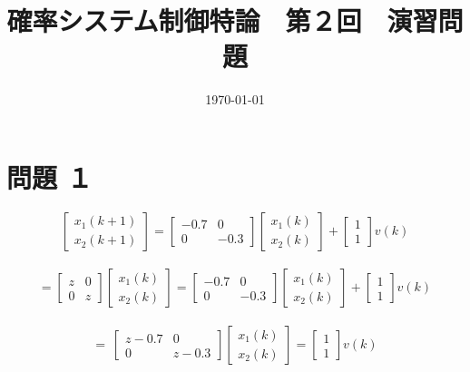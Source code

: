 \documentclass{article}
\author{}
\title{確率システム制御特論　第２回　演習問題}
\date{\today}
\begin{document}
  \maketitle

\section{問題 １}

$$  \begin{bmatrix}
    x_1(k+1)\\x_2(k+1)
  \end{bmatrix}
=
  \begin{bmatrix}
    -0.7 & 0 \\ 0 & -0.3
  \end{bmatrix}
  \begin{bmatrix}
    x_1(k)\\x_2(k)
  \end{bmatrix}
+
  \begin{bmatrix}
    1\\1
  \end{bmatrix}
v(k)$$
~\\

$$=\begin{bmatrix}
  z & 0 \\ 0 & z
\end{bmatrix}
\begin{bmatrix}
  x_1(k)\\x_2(k)
\end{bmatrix}
=
\begin{bmatrix}
  -0.7 & 0 \\ 0 & -0.3
\end{bmatrix}
\begin{bmatrix}
  x_1(k)\\x_2(k)
\end{bmatrix}
+
\begin{bmatrix}
  1\\1
\end{bmatrix}
v(k)$$
~\\

$$= \ \begin{bmatrix}
  z-0.7 & 0 \\ 0 & z-0.3
\end{bmatrix}
\begin{bmatrix}
  x_1(k)\\x_2(k)
\end{bmatrix}
=
\begin{bmatrix}
  1\\1
\end{bmatrix}
v(k)$$
~\\
\end{document}
